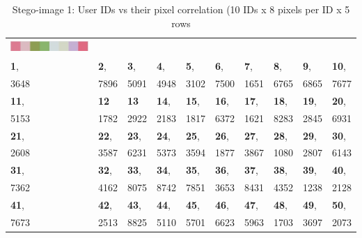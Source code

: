     \begin{table}[h!]
    \caption{Stego-image 1: User IDs vs their pixel correlation (10 IDs x 8 pixels per ID x 5 rows}
    \centering
     \begin{tabular}{|p{} | p{}| p{} | p{} | p{} | p{} | p{} | p{} | p{} | p{} |} 
     
     \hline
     \begin{minipage}{.075\textwidth}
      \includegraphics[width=\linewidth, height=5mm]{Chapter3/Figs/TablePixels.jpg}
    \end{minipage}& & & & & & & & & \\[1ex]
     \textbf{1}, & \textbf{2}, & \textbf{3}, & \textbf{4}, & \textbf{5}, & \textbf{6}, & \textbf{7}, & \textbf{8}, & \textbf{9}, & \textbf{10},  \\[1ex]
     3648 & 7896 & 5091 & 4948 & 3102 & 7500 & 1651 & 6765 & 6865 & 7677  \\[1ex]
     
     \hline 
     \textbf{11}, & \textbf{12} & \textbf{13} & \textbf{14}, & \textbf{15}, & \textbf{16}, & \textbf{17}, & \textbf{18}, & \textbf{19}, & \textbf{20},  \\[1ex]
    5153 & 1782 & 2922 & 2183 & 1817 & 6372 & 1621 & 8283 & 2845 & 6931  \\[1ex]
     
     \hline
     \textbf{21}, & \textbf{22}, & \textbf{23}, & \textbf{24}, & \textbf{25}, & \textbf{26}, & \textbf{27}, & \textbf{28}, & \textbf{29}, & \textbf{30},  \\[1ex]
    2608 & 3587 & 6231 & 5373 & 3594 & 1877 & 3867 & 1080 & 2807 & 6143  \\[1ex]
     
     \hline           
     \textbf{31}, & \textbf{32}, & \textbf{33}, & \textbf{34}, & \textbf{35}, & \textbf{36}, & \textbf{37}, & \textbf{38}, & \textbf{39}, & \textbf{40},  \\[1ex]
     7362 & 4162 & 8075 & 8742 & 7851 & 3653 & 8431 & 4352 & 1238 & 2128  \\[1ex]
     
     \hline
     \textbf{41}, & \textbf{42}, & \textbf{43}, & \textbf{44}, & \textbf{45}, & \textbf{46}, & \textbf{47}, & \textbf{48}, & \textbf{49}, & \textbf{50},  \\[1ex]
    7673 & 2513 & 8825 & 5110 & 5701 & 6623 & 5963 & 1703 & 3697 & 2073  \\[1ex]
     
     \hline
     
     \end{tabular}
    \end{table}
    


